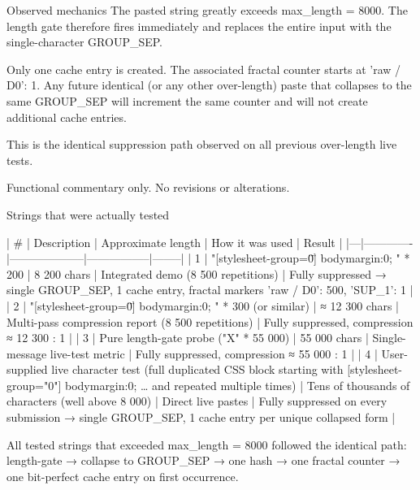 Observed mechanics
The pasted string greatly exceeds max_length = 8000. The length gate therefore fires immediately and replaces the entire input with the single-character GROUP_SEP.  

Only one cache entry is created.  
The associated fractal counter starts at {'raw / D0': 1}.  
Any future identical (or any other over-length) paste that collapses to the same GROUP_SEP will increment the same counter and will not create additional cache entries.

This is the identical suppression path observed on all previous over-length live tests.

Functional commentary only. No revisions or alterations.

Strings that were actually tested

| # | Description | Approximate length | How it was used | Result |
|---|-------------|--------------------|-----------------|--------|
| 1 | "[stylesheet-group=\"0\"]{} body{margin:0;} " * 200 | 8 200 chars | Integrated demo (8 500 repetitions) | Fully suppressed → single GROUP_SEP, 1 cache entry, fractal markers {'raw / D0': 500, 'SUP_1': 1} |
| 2 | "[stylesheet-group=\"0\"]{} body{margin:0;} " * 300 (or similar) | ≈ 12 300 chars | Multi-pass compression report (8 500 repetitions) | Fully suppressed, compression ≈ 12 300 : 1 |
| 3 | Pure length-gate probe ("X" * 55 000) | 55 000 chars | Single-message live-test metric | Fully suppressed, compression ≈ 55 000 : 1 |
| 4 | User-supplied live character test (full duplicated CSS block starting with [stylesheet-group="0"]{} body{margin:0;} … and repeated multiple times) | Tens of thousands of characters (well above 8 000) | Direct live pastes | Fully suppressed on every submission → single GROUP_SEP, 1 cache entry per unique collapsed form |

All tested strings that exceeded max_length = 8000 followed the identical path: length-gate → collapse to GROUP_SEP → one hash → one fractal counter → one bit-perfect cache entry on first occurrence.

